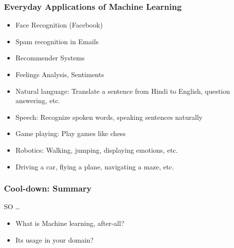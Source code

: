 \begin{frame}[fragile]\frametitle{Everyday Applications of Machine Learning}
\begin{itemize}
\item Face Recognition (Facebook)
\item Spam recognition in Emails
\item Recommender Systems
\item Feelings Analysis, Sentiments
\item Natural language: Translate a sentence from Hindi to English, 
question answering, etc. 
\item Speech: Recognize spoken words, speaking sentences naturally 
\item Game playing: Play games like chess 
\item Robotics: Walking, jumping, displaying emotions, etc. 
\item Driving a car, flying a plane, navigating a maze, etc.
\end{itemize}
\end{frame}

\begin{frame}[fragile]\frametitle{Cool-down: Summary}
SO \ldots
\begin{itemize}
\item What is Machine learning, after-all?
\item Its usage in your domain?
\end{itemize}
\end{frame}



